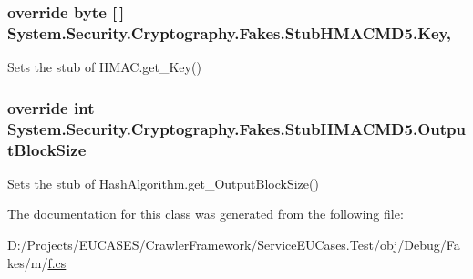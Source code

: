 \hypertarget{class_system_1_1_security_1_1_cryptography_1_1_fakes_1_1_stub_h_m_a_c_m_d5_a7dc2483e22665a1a942f0e424967b92e}{
\subsubsection[{Key}]{\setlength{\rightskip}{0pt plus 5cm}override byte \mbox{[}$\,$\mbox{]} System.\-Security.\-Cryptography.\-Fakes.\-Stub\-H\-M\-A\-C\-M\-D5.\-Key\hspace{0.3cm}{\ttfamily [get]}, {\ttfamily [set]}}}\label{class_system_1_1_security_1_1_cryptography_1_1_fakes_1_1_stub_h_m_a_c_m_d5_a7dc2483e22665a1a942f0e424967b92e}


Sets the stub of H\-M\-A\-C.\-get\-\_\-\-Key()

\hypertarget{class_system_1_1_security_1_1_cryptography_1_1_fakes_1_1_stub_h_m_a_c_m_d5_ac633a4b853e67ba94aefbd3e61512108}{
\subsubsection[{Output\-Block\-Size}]{\setlength{\rightskip}{0pt plus 5cm}override int System.\-Security.\-Cryptography.\-Fakes.\-Stub\-H\-M\-A\-C\-M\-D5.\-Output\-Block\-Size\hspace{0.3cm}{\ttfamily [get]}}}\label{class_system_1_1_security_1_1_cryptography_1_1_fakes_1_1_stub_h_m_a_c_m_d5_ac633a4b853e67ba94aefbd3e61512108}


Sets the stub of Hash\-Algorithm.\-get\-\_\-\-Output\-Block\-Size()



The documentation for this class was generated from the following file\-:\begin{DoxyCompactItemize}
\item 
D\-:/\-Projects/\-E\-U\-C\-A\-S\-E\-S/\-Crawler\-Framework/\-Service\-E\-U\-Cases.\-Test/obj/\-Debug/\-Fakes/m/\hyperlink{m_2f_8cs}{f.\-cs}\end{DoxyCompactItemize}
